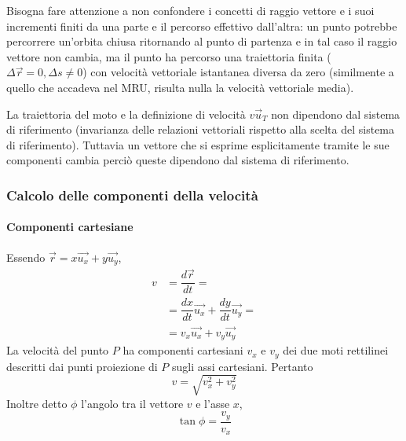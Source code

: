\documentclass[class=book, crop=false, oneside, 12pt]{standalone}
\begin{document}
  Bisogna fare attenzione a non confondere i concetti di raggio vettore e i suoi incrementi finiti da una parte e il percorso effettivo dall'altra: un punto potrebbe percorrere un'orbita chiusa ritornando al punto di partenza e in tal caso il raggio vettore non cambia, ma il punto ha percorso una traiettoria finita (\(\Delta \overrightarrow{r} = 0, \Delta s \neq 0\)) con velocità vettoriale istantanea diversa da zero (similmente a quello che accadeva nel MRU, risulta nulla la velocità vettoriale media).

  La traiettoria del moto e la definizione di velocità \(v \overrightarrow{u}_T\) non dipendono dal sistema di riferimento (invarianza delle relazioni vettoriali rispetto alla scelta del sistema di riferimento).
  Tuttavia un vettore che si esprime esplicitamente tramite le sue componenti cambia perciò queste dipendono dal sistema di riferimento.
		\subsubsection{Calcolo delle componenti della velocit\`a}
			\paragraph{Componenti cartesiane}
      Essendo $\overrightarrow{r}=x\overrightarrow{u_x}+y\overrightarrow{u_y}$,
			\begin{align*}
        v &=\dfrac{d\overrightarrow{r}}{dt}=\\
          &=\dfrac{dx}{dt}\overrightarrow{u_x}+\dfrac{dy}{dt}\overrightarrow{u_y}=\\
          &=v_x\overrightarrow{u_x} + v_y\overrightarrow{u_y}
			\end{align*}
			La velocit\`a del punto $P$ ha componenti cartesiani $v_x$ e $v_y$ dei due moti rettilinei descritti dai punti proiezione di $P$ sugli assi cartesiani.
			Pertanto
			$$v=\sqrt{v^2_x+v_y^2}$$
			Inoltre detto $\phi$ l'angolo tra il vettore $v$ e l'asse $x$,
			$$\tan\phi = \dfrac{v_y}{v_x}$$
\end{document}
